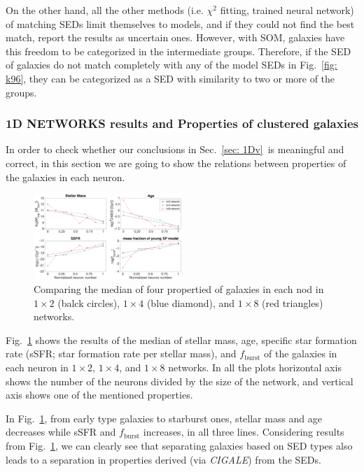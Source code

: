             On the other hand, all the other methods (i.e. $\chi^2$ fitting, trained neural network) of matching SEDs limit themselves to models, and if they could not find the best match, report the results as uncertain ones.
            However, with SOM, galaxies have this freedom to be categorized in the intermediate groups.
            Therefore, if the SED of galaxies do not match completely with any of the model SEDs in Fig.~\ref{fig: k96}, they can be categorized as a SED with similarity to two or more of the groups.

                        
        
        
        \subsubsection{1D NETWORKS results and Properties of clustered galaxies}
        
        In order to check whether our conclusions in Sec.~\ref{sec: 1Dv}~is meaningful and correct, in this section we are going to show the relations between properties of the galaxies in each neuron.
        
        \begin{figure}
            \centering
            \includegraphics[width=0.5\textwidth]{../images0.01/1d/props5.png}
            \caption{Comparing the median of four propertied of galaxies in each nod in $1\times2$ (balck circles), $1\times4$ (blue diamond), and $1\times8$ (red triangles) networks.}
            \label{fig: props}
        \end{figure}
       
        Fig.~\ref{fig: props} shows the results of the median of stellar mass, age, specific star formation rate (sSFR; star formation rate per stellar mass), and $f_\mathrm{burst}$ of the galaxies in each neuron in $1\times2$, $1\times4$, and $1\times8$ networks.
        In all the plots horizontal axis shows the number of the neurons divided by the size of the network, and vertical axis shows one of the mentioned properties.
        
        In Fig.~\ref{fig: props}, from early type galaxies to starburst ones, stellar mass and age decreases while sSFR and $f_\mathrm{burst}$ increases, in all three lines. 
        Considering results from Fig.~\ref{fig: props}, we can clearly see that separating galaxies based on SED types also leads to a separation in properties derived (via {\em CIGALE}) from the SEDs.
    
